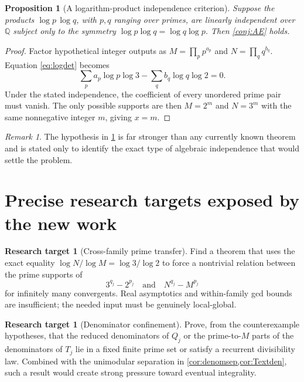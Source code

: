 \documentclass[11pt,oneside]{article}
\newtheorem{proposition}[theorem]{Proposition}
\theoremstyle{definition}
\newtheorem{problem}[theorem]{Research target}
\theoremstyle{remark}
\newtheorem{remark}[theorem]{Remark}
\newcommand{\Q}{\mathbb Q}
\begin{document}
\begin{proposition}[A logarithm-product independence criterion]
\label{prop:productcriterion}
Suppose the products $\log p\,\log q$, with $p,q$ ranging over primes, are
linearly independent over $\Q$ subject only to the symmetry
$\log p\log q=\log q\log p$.  Then \cref{conj:AE} holds.
\end{proposition}

\begin{proof}
Factor hypothetical integer outputs as
$M=\prod_p p^{a_p}$ and $N=\prod_q q^{b_q}$.  Equation \eqref{eq:logdet}
becomes
\[
 \sum_p a_p\log p\log3-
 \sum_q b_q\log q\log2=0.
\]
Under the stated independence, the coefficient of every unordered prime pair
must vanish.  The only possible supports are then $M=2^m$ and $N=3^m$ with
the same nonnegative integer $m$, giving $x=m$.
\end{proof}

\begin{remark}
The hypothesis in \cref{prop:productcriterion} is far stronger than any
currently known theorem and is stated only to identify the exact type of
algebraic independence that would settle the problem.
\end{remark}

\section{Precise research targets exposed by the new work}

\begin{problem}[Cross-family prime transfer]
Find a theorem that uses the exact equality
$\log N/\log M=\log3/\log2$ to force a nontrivial relation between the prime
supports of
\[
  3^{q_j}-2^{p_j}
  \quad\text{and}\quad
  N^{q_j}-M^{p_j}
\]
for infinitely many convergents.  Real asymptotics and within-family gcd
bounds are insufficient; the needed input must be genuinely local-global.
\end{problem}

\begin{problem}[Denominator confinement]
Prove, from the counterexample hypotheses, that the reduced denominators of
$Q_j$ or the prime-to-$M$ parts of the denominators of $T_j$ lie in a fixed
finite prime set or satisfy a recurrent divisibility law.  Combined with the
unimodular separation in \cref{cor:denomsep,cor:Textden}, such a result would
create strong pressure toward eventual integrality.
\end{problem}
\end{document}

